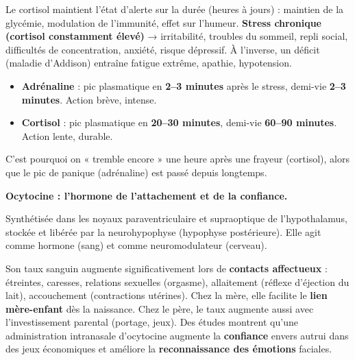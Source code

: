 \documentclass[11pt]{article}
\newcommand{\cle}[1]{{\popxbold\color{popdark}#1}}
\begin{document}
\begin{propriete}
Le cortisol maintient l'état d'alerte sur la durée (heures à jours) : maintien de la glycémie, modulation de l'immunité, effet sur l'humeur. \textbf{Stress chronique (cortisol constamment élevé)} → irritabilité, troubles du sommeil, repli social, difficultés de concentration, anxiété, risque dépressif. À l'inverse, un déficit (maladie d'Addison) entraîne fatigue extrême, apathie, hypotension.
\end{propriete}

\begin{exemplebox}
\begin{itemize}
    \item \textbf{Adrénaline} : pic plasmatique en \textbf{2--3 minutes} après le stress, demi-vie \textbf{2--3 minutes}. Action brève, intense.
    \item \textbf{Cortisol} : pic plasmatique en \textbf{20--30 minutes}, demi-vie \textbf{60--90 minutes}. Action lente, durable.
\end{itemize}
C'est pourquoi on « tremble encore » une heure après une frayeur (cortisol), alors que le pic de panique (adrénaline) est passé depuis longtemps.
\end{exemplebox}

\textbf{Ocytocine : l'hormone de l'attachement et de la confiance.}\par

Synthétisée dans les noyaux \cle{paraventriculaire} et \cle{supraoptique} de l'\cle{hypothalamus}, stockée et libérée par la \cle{neurohypophyse} (hypophyse postérieure). Elle agit comme hormone (sang) et comme neuromodulateur (cerveau).

\begin{savaistu}
Son taux sanguin augmente significativement lors de \textbf{contacts affectueux} : étreintes, caresses, relations sexuelles (orgasme), allaitement (réflexe d'éjection du lait), accouchement (contractions utérines). Chez la mère, elle facilite le \textbf{lien mère-enfant} dès la naissance. Chez le père, le taux augmente aussi avec l'investissement parental (portage, jeux). Des études montrent qu'une administration intranasale d'ocytocine augmente la \textbf{confiance} envers autrui dans des jeux économiques et améliore la \textbf{reconnaissance des émotions} faciales.
\end{savaistu}
\end{document}
